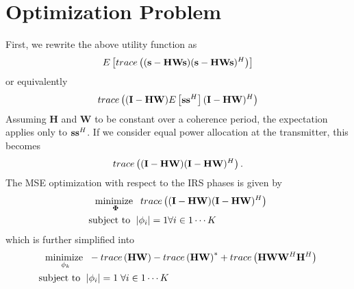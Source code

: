 \documentclass[12pt,a4paper]{report}
\begin{document}
\section{Optimization Problem}
First, we rewrite the above utility function as
	\begin{equation}
E\left[ \mathop{trace}\left((\mathbf{s} - \mathbf{H}\mathbf{W}\mathbf{s})(\mathbf{s} - \mathbf{H}\mathbf{W}\mathbf{s})^H \right)\right]
\end{equation}
or equivalently
	\begin{equation}
 \mathop{trace}\left((\mathbf{I} - \mathbf{H}\mathbf{W})E\left[\mathbf{s}\mathbf{s}^H\right](\mathbf{I} - \mathbf{H}\mathbf{W})^H \right)
\end{equation}
Assuming $\mathbf{H}$ and $\mathbf{W}$ to be constant over a coherence period, the expectation applies only to $\mathbf{s} \mathbf{s}^H$. If we consider equal power allocation at the transmitter, this becomes
	\begin{equation}
\mathop{trace}\left((\mathbf{I} - \mathbf{H}\mathbf{W})(\mathbf{I} - \mathbf{H}\mathbf{W})^H \right).
\end{equation}
The MSE optimization with respect to the IRS phases is given by
	\begin{align}
	    \underset{\boldsymbol{\Phi}}{\text{minimize }}
	    & \; \mathop{trace}\left((\mathbf{I} - \mathbf{H}\mathbf{W})
	   (\mathbf{I} - \mathbf{H}\mathbf{W})^H \right)
	     \\
	    \text{subject to  } \; &
	    | \phi_i | = 1  \forall i \in {1 \cdots	 K}
	\end{align}\label{mse_problem}
	which is further simplified into
	\begin{subequations}
	\label{mse_problem_s}
	\begin{align}
	   	    \underset{\phi_k}{\text{minimize }}
	    & \; - \mathop{trace} \left( \mathbf{H}\mathbf{W}\right) - \mathop{trace} \left( \mathbf{H}\mathbf{W}\right)^* +
	    \mathop{trace}\left(\mathbf{H}\mathbf{W} \mathbf{W}^H \mathbf{H}^H\right)
	     \\
	    \text{subject to  } \; &
	    | \phi_i | = 1   \; \forall i \in {1 \cdots	 K}
	\end{align}
	\end{subequations}	
	
\end{document}
